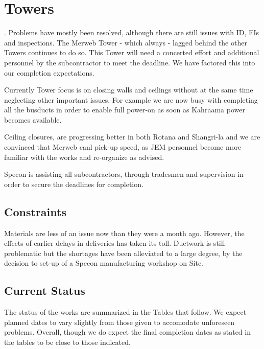 \chapter{Towers}\label{sec:towers1}

. Problems have mostly been resolved, although there are still issues with ID,  EIs and inspections.  The Merweb Tower - which always - lagged behind the other Towers continues to do so. This Tower will need a concerted effort and additional personnel by the subcontractor to meet the deadline. We have factored this into our completion expectations.

Currently Tower focus is on closing walls and ceilings without at the same time neglecting other important issues. For example we are now busy with completing all the busducts in order to enable full power-on as soon as Kahraama power becomes available.

Ceiling closures, are progressing better in both Rotana and Shangri-la and we are convinced that Merweb canl pick-up speed, as JEM personnel become more familiar with the works and re-organize as advised.

Specon is assisting all subcontractors, through tradesmen and supervision  in order to secure the deadlines for completion.

\section{Constraints}

Materials are less of an issue now than they were a month ago. However, the effects of earlier delays in deliveries has taken its toll. Ductwork is still problematic but the shortages have been alleviated to a large degree, by the decision to set-up of a Specon manufacturing workshop on Site.

\section{Current Status}
The status of the works are summarized in the Tables that follow. We expect planned dates to vary slightly from those given to accomodate unforeseen problems. Overall, though we do expect the final completion dates as stated in the tables to be close to those indicated.








